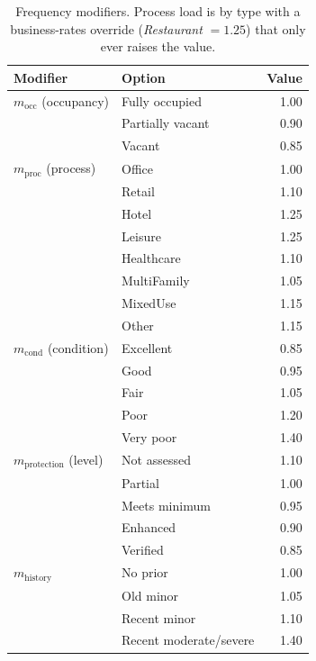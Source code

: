 \documentclass[11pt,a4paper]{article}
\begin{document}
\begin{table}[H]
\centering
\caption{Frequency modifiers. Process load is by type with a business-rates
override (\emph{Restaurant} $= 1.25$) that only ever raises the value.}
\begin{tabular}{llr}
\toprule
Modifier & Option & Value \\
\midrule
$m_{\text{occ}}$ (occupancy) & Fully occupied & 1.00 \\
                             & Partially vacant & 0.90 \\
                             & Vacant & 0.85 \\
\midrule
$m_{\text{proc}}$ (process) & Office & 1.00 \\
                            & Retail & 1.10 \\
                            & Hotel & 1.25 \\
                            & Leisure & 1.25 \\
                            & Healthcare & 1.10 \\
                            & MultiFamily & 1.05 \\
                            & MixedUse & 1.15 \\
                            & Other & 1.15 \\
\midrule
$m_{\text{cond}}$ (condition) & Excellent & 0.85 \\
                              & Good & 0.95 \\
                              & Fair & 1.05 \\
                              & Poor & 1.20 \\
                              & Very poor & 1.40 \\
\midrule
$m_{\text{protection}}$ (level) & Not assessed & 1.10 \\
                                & Partial & 1.00 \\
                                & Meets minimum & 0.95 \\
                                & Enhanced & 0.90 \\
                                & Verified & 0.85 \\
\midrule
$m_{\text{history}}$ & No prior & 1.00 \\
                     & Old minor & 1.05 \\
                     & Recent minor & 1.10 \\
                     & Recent moderate/severe & 1.40 \\
\bottomrule
\end{tabular}
\end{table}
\end{document}

